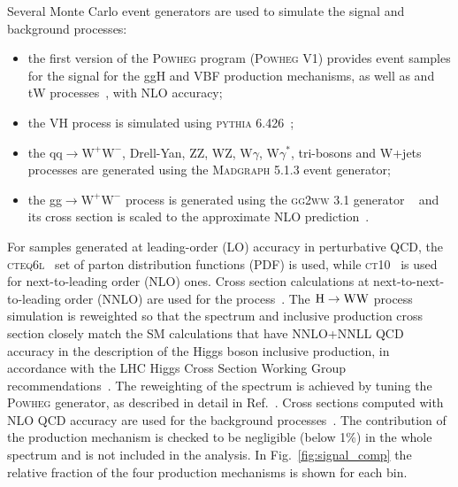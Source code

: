 Several Monte Carlo event generators are used to simulate the signal and background processes:
\begin{itemize}
\item the first version of the \textsc{Powheg} program (\textsc{Powheg V1}) provides event samples for the \hww signal
for the ggH and VBF production mechanisms, as well as \ttbar and tW processes~\cite{Alioli:2011as}, with NLO accuracy;
\item the VH process is simulated using \textsc{pythia 6.426}~\cite{Sjostrand:2006za};
\item the $\mathrm{qq} \to \mathrm{W^{+}W^{-}}$, Drell-Yan, ZZ, WZ, W$\gamma$, W$\gamma^*$, tri-bosons and W+jets processes are generated using
the \textsc{Madgraph 5.1.3} event generator;
\item the gg$\to \mathrm{W^{+}W^{-}}$ process is generated using the \textsc{gg2ww} 3.1 generator ~\cite{Binoth:2006mf} and its cross section is scaled to the approximate NLO prediction~\cite{Bonvini:2013jha,Passarino:2013bha}.
\end{itemize}
For samples generated at leading-order (LO) accuracy in perturbative QCD, the \textsc{cteq6l}~\cite{Lai:2010nw} set of parton distribution functions
(PDF) is used, while \textsc{ct10}~\cite{Lai:2010vv} is used for next-to-leading order (NLO) ones.
Cross section calculations at next-to-next-to-leading order (NNLO) are used for the \hww process~\cite{Dittmaier:2011ti}.
The ${\mathrm{H}\to\mathrm{WW}}$ process simulation is reweighted so that the \pth spectrum and inclusive production cross section closely match the SM calculations that have NNLO+NNLL QCD accuracy in the description of the Higgs boson inclusive production, in accordance with the LHC Higgs Cross Section Working Group recommendations~\cite{Heinemeyer:2013tqa}.
The reweighting of the \pth spectrum is achieved by tuning the \textsc{Powheg} generator, as described in detail in Ref.~\cite{Alioli:2010xd}.
Cross sections computed with NLO QCD accuracy are used for the background processes~\cite{Heinemeyer:2013tqa}.
The contribution of the \ttH production mechanism is checked to be negligible (below 1\%) in the whole \pth spectrum and is not included in the analysis. In Fig.~\ref{fig:signal_comp} the relative fraction of the four production mechanisms is shown for each \pth bin.


